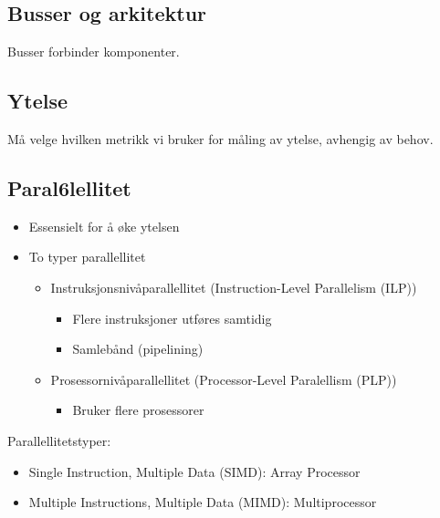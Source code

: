 \documentclass{article}
\begin{document}
			\subsection{Busser og arkitektur}
				Busser forbinder komponenter.
			\subsection{Ytelse}
				Må velge hvilken metrikk vi bruker for måling av ytelse, avhengig av behov.
			\subsection{Paral6lellitet}
				\begin{itemize}
					\item Essensielt for å øke ytelsen
					\item To typer parallellitet
						\begin{itemize}
							\item Instruksjonsnivåparallellitet (Instruction-Level Parallelism (ILP))
								\begin{itemize}
									\item Flere instruksjoner utføres samtidig
									\item Samlebånd (pipelining)
								\end{itemize}
							\item Prosessornivåparallellitet (Processor-Level Paralellism (PLP))
								\begin{itemize}
									\item Bruker flere prosessorer
								\end{itemize}
						\end{itemize}
				\end{itemize}
				Parallellitetstyper:
				\begin{itemize}
					\item  Single Instruction, Multiple Data (SIMD): Array Processor
					\item Multiple Instructions, Multiple Data (MIMD): Multiprocessor
				\end{itemize}
		
\end{document}
